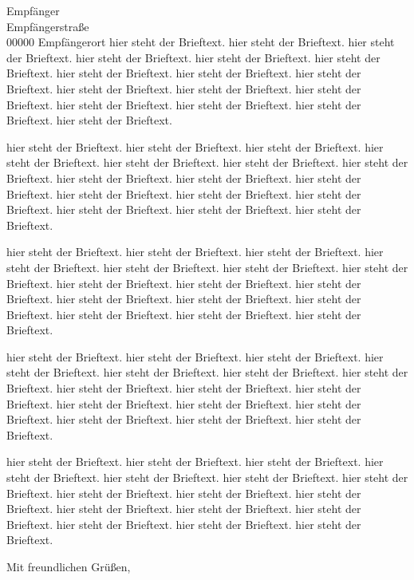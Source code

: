 \documentclass[fontsize=11pt, ngerman]{scrlttr2}
\begin{document}
\begin{letter}{Empfänger\\
  Empfängerstraße\\
  00000 Empfängerort}
  hier steht der Brieftext. hier steht der Brieftext. hier steht der Brieftext. hier steht der Brieftext.
  hier steht der Brieftext. hier steht der Brieftext. hier steht der Brieftext. hier steht der Brieftext.
  hier steht der Brieftext. hier steht der Brieftext. hier steht der Brieftext. hier steht der Brieftext.
  hier steht der Brieftext. hier steht der Brieftext. hier steht der Brieftext. hier steht der Brieftext.

  hier steht der Brieftext. hier steht der Brieftext. hier steht der Brieftext. hier steht der Brieftext.
  hier steht der Brieftext. hier steht der Brieftext. hier steht der Brieftext. hier steht der Brieftext.
  hier steht der Brieftext. hier steht der Brieftext. hier steht der Brieftext. hier steht der Brieftext.
  hier steht der Brieftext. hier steht der Brieftext. hier steht der Brieftext. hier steht der Brieftext.

  hier steht der Brieftext. hier steht der Brieftext. hier steht der Brieftext. hier steht der Brieftext.
  hier steht der Brieftext. hier steht der Brieftext. hier steht der Brieftext. hier steht der Brieftext.
  hier steht der Brieftext. hier steht der Brieftext. hier steht der Brieftext. hier steht der Brieftext.
  hier steht der Brieftext. hier steht der Brieftext. hier steht der Brieftext. hier steht der Brieftext.

  hier steht der Brieftext. hier steht der Brieftext. hier steht der Brieftext. hier steht der Brieftext.
  hier steht der Brieftext. hier steht der Brieftext. hier steht der Brieftext. hier steht der Brieftext.
  hier steht der Brieftext. hier steht der Brieftext. hier steht der Brieftext. hier steht der Brieftext.
  hier steht der Brieftext. hier steht der Brieftext. hier steht der Brieftext. hier steht der Brieftext.

  hier steht der Brieftext. hier steht der Brieftext. hier steht der Brieftext. hier steht der Brieftext.
  hier steht der Brieftext. hier steht der Brieftext. hier steht der Brieftext. hier steht der Brieftext.
  hier steht der Brieftext. hier steht der Brieftext. hier steht der Brieftext. hier steht der Brieftext.
  hier steht der Brieftext. hier steht der Brieftext. hier steht der Brieftext. hier steht der Brieftext.

  \closing{Mit freundlichen Grüßen,}


  \vfill
  \encl{}%


 \end{letter}
\end{document}
